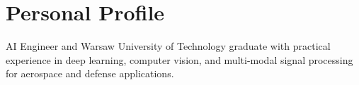     \section{Personal Profile}

    \begin{onecolentry}
        AI Engineer and Warsaw University of Technology graduate with practical experience in deep learning, computer vision, and multi-modal signal processing for aerospace and defense applications.
    \end{onecolentry}

